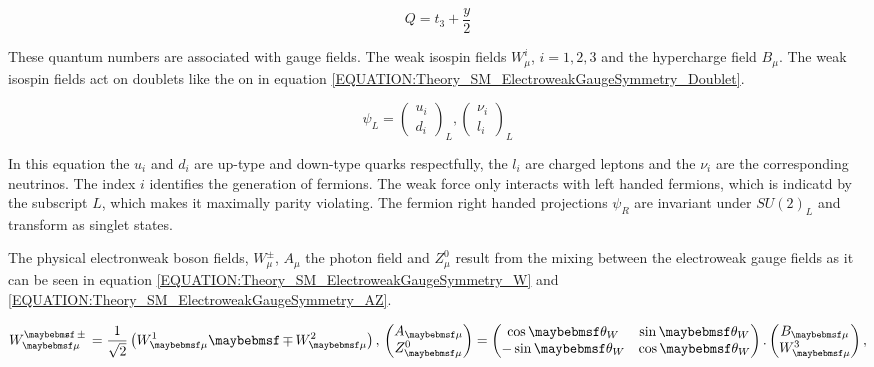 \begin{equation}
Q = t_{3} + \frac{y}{2}
\label{EQUATION:Theory_SM_ElectroweakGaugeSymmetry_ElecCharge}
\end{equation}

These quantum numbers are associated with gauge fields. The weak isospin fields $W_{\mu}^{i}$, $i = 1,2,3$ and the hypercharge field $B_{\mu}$. The weak isospin fields act on doublets like the on in equation \ref{EQUATION:Theory_SM_ElectroweakGaugeSymmetry_Doublet}.
 
\begin{equation}
\psi_{L} =  \begin{pmatrix} u_{i} \\ d_{i} \end{pmatrix}_{L} ,   
\begin{pmatrix} \nu_{i} \\ {l_{i}} \end{pmatrix}_{L}
\label{EQUATION:Theory_SM_ElectroweakGaugeSymmetry_Doublet}
\end{equation}

In this equation the $u_{i}$ and $d_{i}$ are up-type and down-type quarks respectfully, the $l_{i}$ are charged leptons and the $\nu_{i}$ are the corresponding neutrinos. The index $i$ identifies the generation of fermions. The weak force only interacts with left handed fermions, which is indicatd by the subscript $L$, which makes it maximally parity violating. The fermion right handed projections $\psi_{R}$ are invariant under $SU(2)_{L}$ and transform as singlet states.
 
The physical electronweak boson fields, $W_{\mu}^{\pm}$, $A_{\mu}$ the photon field and $Z_{\mu}^{0}$ result from the mixing between the electroweak gauge fields as it can be seen in equation \ref{EQUATION:Theory_SM_ElectroweakGaugeSymmetry_W} and \ref{EQUATION:Theory_SM_ElectroweakGaugeSymmetry_AZ}.


\begin{equation}
W_{\mu}^{\pm} = \frac{1}{\sqrt{2}}\left(W_{\mu}^{1} \mp W_{\mu}^{2}\right) ,\label{EQUATION:Theory_SM_ElectroweakGaugeSymmetry_W}\\
\begin{pmatrix} A_{\mu} \\ Z_{\mu}^{0} \end{pmatrix} = 
\begin{pmatrix} \cos{\theta_{W}} & \sin{\theta_{W}} \\ -\sin{\theta_{W}} &
\cos{\theta_{W}} \end{pmatrix} . 
\begin{pmatrix} B_{\mu} \\ W_{\mu}^{3} \end{pmatrix} ,
\label{EQUATION:Theory_SM_ElectroweakGaugeSymmetry_AZ}
\end{equation}

